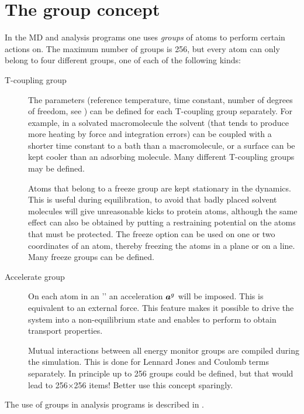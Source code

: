 \section{The group concept}
\label{sec:group}
In the {\gromacs} MD and analysis programs one uses {\em groups} of
atoms to perform certain actions on. The maximum number of groups is
256, but every atom can only belong to four different groups, one of
each of the following kinds:
\begin{description}
\item[T-coupling group]
The  parameters (reference
temperature, time constant, number of degrees of freedom, see
) can be defined for each T-coupling group
separately. For example, in a solvated macromolecule the solvent (that
tends to produce more heating by force and integration errors) can be
coupled with a shorter time constant to a bath than a macromolecule,
or a surface can be kept cooler than an adsorbing molecule. Many
different T-coupling groups may be defined.
\item[]
Atoms that belong to a freeze group are kept stationary in the
dynamics. This is useful during equilibration, {\eg} to avoid that badly
placed solvent molecules will give unreasonable kicks to  protein atoms,
although the same effect can also be obtained by putting a restraining
potential on the atoms that must be protected. The freeze option can be
used on one or two coordinates of an atom, thereby freezing the atoms
in a plane or on a line. Many freeze groups can be defined.
\item[Accelerate group]
On each atom in an '' an acceleration
$\mbox{\boldmath ${a}$}^g$ will be imposed. This is equivalent to an external
force. This feature makes it possible to drive the system into a
non-equilibrium state and enables to perform
 to obtain transport properties.
\item[]
Mutual interactions between all energy monitor groups are compiled
during the simulation. This is done for Lennard Jones and Coulomb
terms separately.  In principle up to 256 groups could be defined, but
that would lead to 256$\times$256 items! Better use this concept
sparingly.
\end{description}
The use of groups in analysis programs is described in
.

